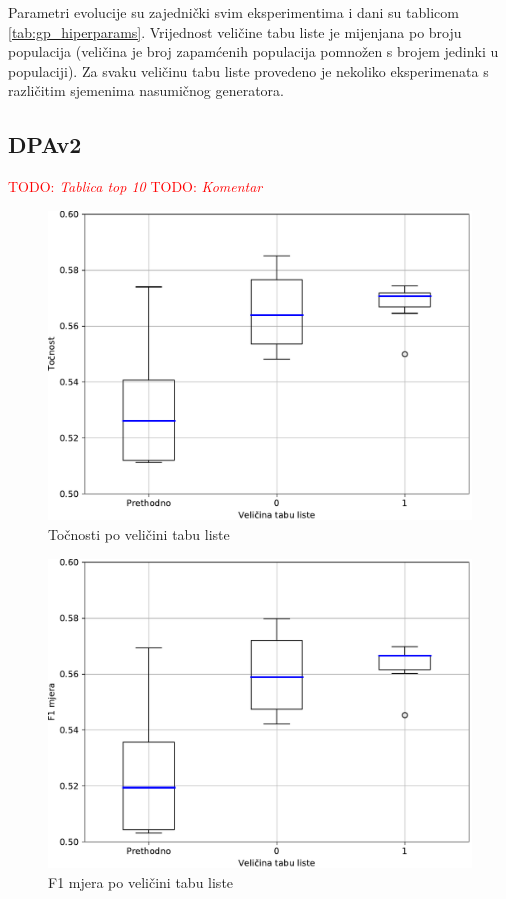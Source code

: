 \documentclass[times, utf8, numeric, diplomski]{fer}
\def\TODO#1{\noindent\textcolor{red}{TODO: \textit{#1}}\newline}
\def\todo#1{\TODO{#1}}
\begin{document}
Parametri evolucije su zajednički svim eksperimentima i dani su tablicom \ref{tab:gp_hiperparams}. Vrijednost veličine tabu liste je mijenjana po broju populacija (veličina je broj zapamćenih populacija pomnožen s brojem jedinki u populaciji). Za svaku veličinu tabu liste provedeno je nekoliko eksperimenata s različitim sjemenima nasumičnog generatora.

\subsection{DPAv2}
\todo{Tablica top 10}
\todo{Komentar}

\begin{figure}[H]
\includegraphics[width=.9\textwidth]{GP_256class_acc_plus.pdf}
\centering
\caption{Točnosti po veličini tabu liste}
\label{fig:gp_256_acc}
\end{figure}

\begin{figure}[H]
\includegraphics[width=.9\textwidth]{GP_256class_f1_plus.pdf}
\centering
\caption{F1 mjera po veličini tabu liste}
\label{fig:gp_256_f1}
\end{figure}
\end{document}
